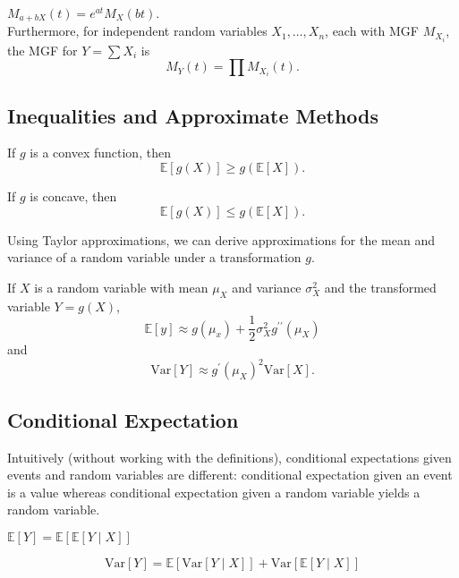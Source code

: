\begin{remark}
$M_{a+bX}(t) = e^{at} M_X(bt)$. \\

Furthermore, for independent random variables $X_1, \dots, X_n$, each with MGF $M_{X_i}$, the MGF for $Y = \sum X_i$ is
\[
    M_Y(t) = \prod M_{X_i}(t).
\]
\end{remark}

\subsection{Inequalities and Approximate Methods}

\begin{theorem}
If $g$ is a convex function, then 
\[
    \mathbb{E}\left[g(X) \right] \geq g(\mathbb{E}\left[X \right] ).
\]

If $g$ is concave, then 
\[
    \mathbb{E}\left[g(X) \right] \leq g(\mathbb{E}\left[X \right] ).
\]
\end{theorem}

Using Taylor approximations, we can derive approximations for the mean and variance of a random variable under a transformation $g$. 
\begin{lemma}
If $X$ is a random variable with mean $\mu_X$ and variance $\sigma^2_X$ and the transformed variable $Y = g(X)$,
\[
    \mathbb{E}\left[y \right] \approx g(\mu _x) + \frac{1}{2}\sigma ^2_X g^{\prime \prime}(\mu_X) 
\]
and 
\[
    \mathrm{Var} \left[ Y \right] \approx g^{\prime}(\mu_X)^2 \mathrm{Var}\left[ X\right].  
\]
\end{lemma}

\subsection{Conditional Expectation}
\begin{remark}
Intuitively (without working with the definitions), conditional expectations given events and random variables are different:
conditional expectation given an event is a value whereas conditional expectation given a random variable yields a random variable.
\end{remark}

\begin{theorem}
$\mathbb{E}\left[Y \right] = \mathbb{E}\left[ \mathbb{E}\left[Y \mid X \right]  \right]$
\end{theorem}

\begin{theorem}
\[    
   \mathrm{Var} \left[Y \right] = \mathbb{E}\left[\mathrm{Var} \left[ Y \mid X \right]  \right] + \mathrm{Var} \left[\mathbb{E}\left[Y \mid X \right]  \right] 
\]
\end{theorem}
